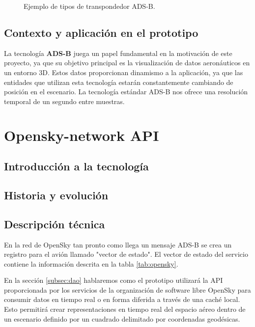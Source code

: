 \documentclass[a4paper, 11pt]{book}
\begin{document}
\begin{itemize}
\begin{figure}[H]
  \caption{Ejemplo de tipos de transpondedor ADS-B.}
  \label{fig:adsbtypes}
\end{figure}
\end{itemize}
\subsection{Contexto y aplicación en el prototipo}
La tecnología \textbf{ADS-B} juega un papel fundamental en la motivación de este proyecto, ya que su objetivo principal es la visualización de datos aeronáuticos en un entorno 3D. Estos datos proporcionan dinamismo a la aplicación, ya que las entidades que utilizan esta tecnología estarán constantemente cambiando de posición en el escenario.
La tecnología estándar ADS-B nos ofrece una resolución temporal de un segundo entre muestras.
\section{Opensky-network API}
\label{sec:opensky}
\subsection{Introducción a la tecnología}
\subsection{Historia y evolución}
\subsection{Descripción técnica}
En la red de OpenSky tan pronto como llega un mensaje ADS-B se crea un registro para el avión llamado "vector de estado".
El vector de estado del servicio contiene la información descrita en la tabla \ref{tab:opensky}.

En la sección \ref{subsec:dao} hablaremos como el prototipo utilizará la API proporcionada por los servicios de la organización de software libre OpenSky para consumir datos en tiempo real o en forma diferida a través de una caché local. Esto permitirá crear representaciones en tiempo real del espacio aéreo dentro de un escenario definido por un cuadrado delimitado por coordenadas geodésicas.
\end{document}
